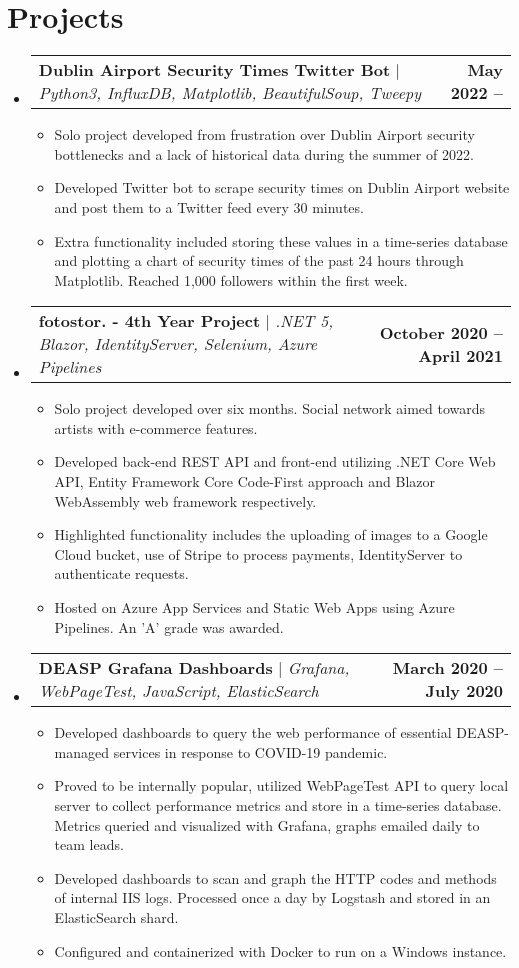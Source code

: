 \documentclass[letterpaper,11pt]{article}
\makeatletter
\newcommand{\resumeItem}[1]{
  \item\small{
    {#1 \vspace{-2pt}}
  }
}
\newcommand{\resumeProjectHeading}[2]{
    \item
    \begin{tabular*}{1.001\textwidth}{l@{\extracolsep{\fill}}r}
      \small#1 & \textbf{\small #2}\\
    \end{tabular*}\vspace{-7pt}
}
\newcommand{\resumeSubHeadingListStart}{\begin{itemize}[leftmargin=0.0in, label={}]}
\newcommand{\resumeSubHeadingListEnd}{\end{itemize}}
\newcommand{\resumeItemListStart}{\begin{itemize}}
\newcommand{\resumeItemListEnd}{\end{itemize}\vspace{-5pt}}
\makeatother
\begin{document}
\section{Projects}
\vspace{-5pt}
\resumeSubHeadingListStart
\resumeProjectHeading
{\textbf{Dublin Airport Security Times Twitter Bot} $|$ \emph{Python3, InfluxDB, Matplotlib, BeautifulSoup, Tweepy }}{May 2022 --}
\resumeItemListStart
\resumeItem{Solo project developed from frustration over Dublin Airport security bottlenecks and a lack of historical data during the summer of 2022.}
\resumeItem{Developed Twitter bot to scrape security times on Dublin Airport website and post them to a Twitter feed every 30 minutes.}
\resumeItem{Extra functionality included storing these values in a time-series database and plotting a chart of security times of the past 24 hours through Matplotlib. Reached 1,000 followers within the first week.}
\resumeItemListEnd
\vspace{-12pt}
\resumeProjectHeading
{\textbf{fotostor. - 4th Year Project} $|$ \emph{.NET 5, Blazor, IdentityServer, Selenium, Azure Pipelines}}{October 2020 -- April 2021}
\resumeItemListStart
\resumeItem{Solo project developed over six months. Social network aimed towards artists with e-commerce features.}
\resumeItem{Developed back-end REST API and front-end utilizing .NET Core Web API, Entity Framework Core Code-First approach and Blazor WebAssembly web framework respectively.}
\resumeItem{Highlighted functionality includes the uploading of images to a Google Cloud bucket, use of Stripe to process payments, IdentityServer to authenticate requests.}
\resumeItem{Hosted on Azure App Services and Static Web Apps using Azure Pipelines. An 'A' grade was awarded.}
\resumeItemListEnd
\vspace{-12pt}
\resumeProjectHeading
{\textbf{DEASP Grafana Dashboards} $|$ \emph{Grafana, WebPageTest, JavaScript, ElasticSearch}}{March 2020 -- July 2020}
\resumeItemListStart
\resumeItem{Developed dashboards to query the web performance of essential DEASP-managed services in response to COVID-19 pandemic.}
\resumeItem{Proved to be internally popular, utilized WebPageTest API to query local server to collect performance metrics and store in a time-series database. Metrics queried and visualized with Grafana, graphs emailed daily to team leads. }
\resumeItem{Developed dashboards to scan and graph the HTTP codes and methods of internal IIS logs. Processed once a day by Logstash and stored in an ElasticSearch shard.}
\resumeItem{Configured and containerized with Docker to run on a Windows instance.}
\resumeItemListEnd 
\vspace{-4pt}
\resumeSubHeadingListEnd
\end{document}
